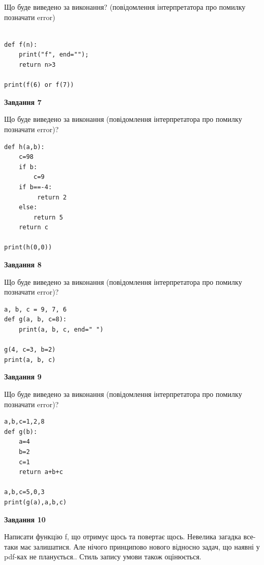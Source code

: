 \documentclass[12pt, ukrainian]{article}
\begin{document}
{\begin {large}
Що буде виведено за виконання? (повідомлення інтерпретатора про помилку позначати error)\par
\begin{verbatim}

def f(n):
    print("f", end="");
    return n>3

print(f(6) or f(7))
\end{verbatim}

{\begin {center}\textbf{Завдання 7}\end {center}}

Що буде виведено за виконання (повідомлення інтерпретатора про помилку позначати error)?\par
\begin{verbatim}
def h(a,b):
    c=98
    if b:
        c=9
    if b==-4:
         return 2
    else: 
        return 5
    return c

print(h(0,0))
\end{verbatim}

{\begin {center}\textbf{Завдання 8}\end {center}}

Що буде виведено за виконання (повідомлення інтерпретатора про помилку позначати error)?\par
\begin{verbatim}
a, b, c = 9, 7, 6
def g(a, b, c=8):
    print(a, b, c, end=" ")

g(4, c=3, b=2)
print(a, b, c)
\end{verbatim}

{\begin {center}\textbf{Завдання 9}\end {center}}

Що буде виведено за виконання (повідомлення інтерпретатора про помилку позначати error)?\par
\begin{verbatim}
a,b,c=1,2,8
def g(b):
    a=4
    b=2
    c=1
    return a+b+c

a,b,c=5,0,3
print(g(a),a,b,c)
\end{verbatim}

{\begin {center}\textbf{Завдання 10}\end {center}}


Написати функцiю f, що отримує щось та повертає щось. Невелика загадка все-таки має залишатися. Але нічого принципово нового відносно задач, що наявні у pdf-ках не планується.. Стиль запису умови також оцінюється.\par
\end {large}}
\newpage
\end{document}
